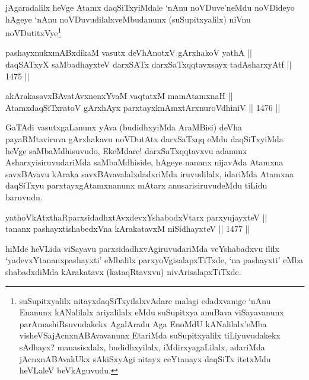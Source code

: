 \begin{artha}
jAgaradalilx heVge Atamx daqSiTxyiMdale `nAnu noVDuve'neMdu noVDideyo hAgeye `nAnu noVDuvudilalxveMbudanunx (suSupitxyalilx) niVnu noVDutitxVye\footnote{suSupitxyalilx nitayxdaqSiTxyilalxvAdare malagi edadxvanige `nAnu Enanunx kANalilalx ariyalilalx eMdu suSupitxya anuBava viSayavanunx parAmashiRsuvudakekx AgalAradu Aga EnoMdU kANalilalx'eMba visheVSajAcnxnABAvavanunx EtariMda suSupitxyalilx tiLiyuvudakekx sAdhayx? manasisxlalx, budidhxyilalx, iMdirxyagaLilalx, adariMda jAcnxnABAvakUkx sAkiSxyAgi nitayx ceYtanayx daqSiTx itetxMdu heVLaleV beVkAguvudu.} 
\end{artha}


\begin{shl}
pashayxnukxmABxdikaM vasutx deVhAnotxV gArxhakoV yathA || \\
daqSATxyX saMbadhayxteV darxSATx darxSaTxqqtavxsayx tadAsharxyAtf ||  1475 ||  
\end{shl}
				
\begin{shl}
akArakasavxBAvatAvxnenxYvaM vaqtatxM mamA\s \s tamxnaH ||  \\
AtamxdaqSiTxratoV gArxhAyx parxtayxknAmxtArxnuroVdhiniV ||  1476 ||  
\end{shl}

\begin{artha}
GaTAdi vasutxgaLanunx yAva (budidhxyiMda AraMBisi) deVha payaRMtaviruva gArxhakavu noVDutAtx darxSaTxqq eMdu daqSiTxyiMda heVge saMbaMdhisuvudo, EkeMdare! darxSaTxqqtavxvu adanunx AsharxyisiruvudariMda saMbaMdhiside, hAgeye nananx nijavAda Atamxna savxBAvavu kAraka savxBAvavalalxdadxriMda iruvudilalx, idariMda Atamxna daqSiTxyu parxtayxgAtamxnanunx mAtarx anusarisiruvudeMdu tiLidu baruvudu.
\end{artha}

\begin{shl}
yathoVkAtxthaRparxsidadhxtAvxdevxYshabodxV\s tarx parxyujayxteV || \\
tananx pashayxtishabedxVna kArakatavxM niSidhayxteV ||  1477 ||  
\end{shl}

\begin{artha}
hiMde heVLida viSayavu parxsidadhxvAgiruvudariMda veYshabadxvu ililx `yadevxYtananxpashayxti' eMbalilx parxyoVgisalapxTiTxde, `na pashayxti' eMba shabadxdiMda kArakatavx (kataqRtavxvu) nivArisalapxTiTxde.
\end{artha}

